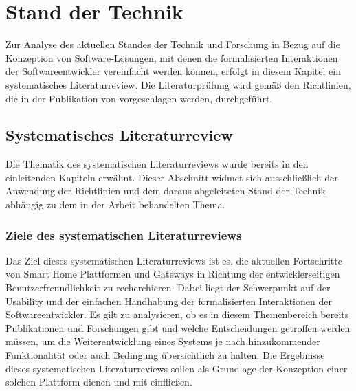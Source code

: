 \chapter{Stand der Technik}
\label{chap:technikStand}
    Zur Analyse des aktuellen Standes der Technik und Forschung in Bezug auf die Konzeption von Software-Lösungen, mit denen 
    die formalisierten Interaktionen der Softwareentwickler vereinfacht werden können, erfolgt in diesem 
    Kapitel ein systematisches Literaturreview. Die Literaturprüfung wird gemäß den Richtlinien, die in der Publikation 
    von \cite{Kitchenham2007} vorgeschlagen werden, durchgeführt. 

    \section{Systematisches Literaturreview}
    \label{subsec:systematischesLiteraturReview}
        Die Thematik des systematischen Literaturreviews wurde bereits in den einleitenden Kapiteln erwähnt. 
        Dieser Abschnitt widmet sich ausschließlich der Anwendung der Richtlinien und dem daraus abgeleiteten Stand der Technik 
        abhängig zu dem in der Arbeit behandelten Thema. 

    \subsection{Ziele des systematischen Literaturreviews}
        Das Ziel dieses systematischen Literaturreviews ist es, die aktuellen Fortschritte von Smart Home Plattformen und 
        Gateways in Richtung der entwicklerseitigen Benutzerfreundlichkeit zu recherchieren. Dabei liegt der Schwerpunkt 
        auf der Usability und der einfachen Handhabung der formalisierten Interaktionen der Softwareentwickler. Es gilt zu 
        analysieren, ob es in diesem Themenbereich bereits Publikationen und Forschungen gibt und welche Entscheidungen 
        getroffen werden müssen, um die Weiterentwicklung eines Systems je nach hinzukommender Funktionalität oder 
        auch Bedingung übersichtlich zu halten. Die Ergebnisse dieses systematischen Literaturreviews sollen 
        als Grundlage der Konzeption einer solchen Plattform dienen und mit einfließen. 

